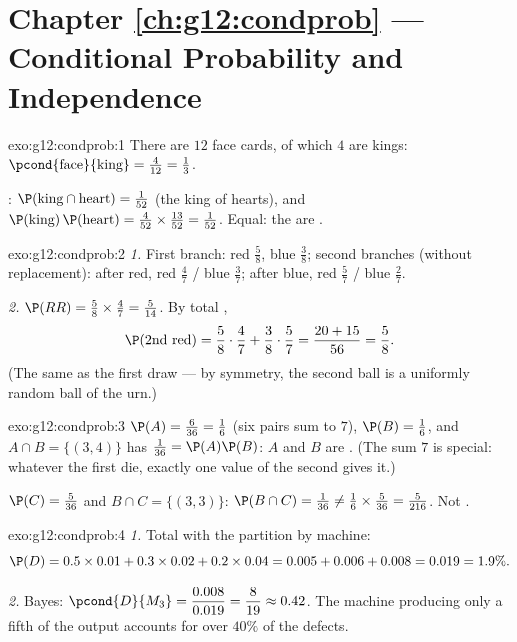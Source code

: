 \section*{Chapter \ref{ch:g12:condprob} --- Conditional Probability and Independence}

\begin{solution}{exo:g12:condprob:1}
There are $12$ face cards, of which $4$ are kings:
$\pcond{\text{face}}{\text{king}} = \frac{4}{12} = \frac13$.

: $\P(\text{king} \cap \text{heart}) = \frac{1}{52}$ (the king
of hearts), and
$\P(\text{king})\,\P(\text{heart}) = \frac{4}{52}\times\frac{13}{52}
= \frac{1}{52}$. Equal: the  are .
\end{solution}

\begin{solution}{exo:g12:condprob:2}
\emph{1.} First branch: red $\frac58$, blue $\frac38$; second branches
(without replacement): after red, red $\frac47$ / blue $\frac37$; after
blue, red $\frac57$ / blue $\frac27$.

\emph{2.} $\P(RR) = \frac58 \times \frac47 = \frac{5}{14}$. By total
,
\[
\P(\text{2nd red}) = \frac58\cdot\frac47 + \frac38\cdot\frac57
= \frac{20 + 15}{56} = \frac58 .
\]
(The same as the first draw --- by symmetry, the second ball is a uniformly
random ball of the urn.)
\end{solution}

\begin{solution}{exo:g12:condprob:3}
$\P(A) = \frac{6}{36} = \frac16$ (six pairs sum to $7$),
$\P(B) = \frac16$, and $A \cap B = \{(3,4)\}$ has 
$\frac{1}{36} = \P(A)\P(B)$: $A$ and $B$ are . (The sum $7$ is
special: whatever the first die, exactly one value of the second gives it.)

$\P(C) = \frac{5}{36}$ and $B \cap C = \{(3,3)\}$:
$\P(B \cap C) = \frac{1}{36} \neq \frac16 \times \frac{5}{36}
= \frac{5}{216}$. Not .
\end{solution}

\begin{solution}{exo:g12:condprob:4}
\emph{1.} Total  with the partition by machine:
\[
\P(D) = 0.5\times0.01 + 0.3\times0.02 + 0.2\times0.04
= 0.005 + 0.006 + 0.008 = 0.019 = 1.9\% .
\]

\emph{2.} Bayes:
$\pcond{D}{M_3} = \dfrac{0.008}{0.019} = \dfrac{8}{19} \approx 0.42$. The
machine producing only a fifth of the output accounts for over $40\%$ of
the defects.
\end{solution}

